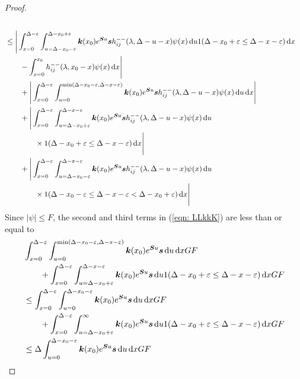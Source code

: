 \begin{proof}
\begin{align}
		\\&\leq \Bigg| \int_{x=0}^{\Delta-\varepsilon}\int_{u=\Delta-x_0-\varepsilon}^{\Delta-x_0+\varepsilon} \boldsymbol k(x_0)e^{\boldsymbol Su}\boldsymbol s h_{ij}^{--}(\lambda, \Delta - u - x) \psi(x) \, \mathrm{d} u 1(\Delta-x_0+\varepsilon\leq \Delta-x-\varepsilon) \, \mathrm{d} x\nonumber
		\\&\qquad{} - \int_{x=0}^{x_0} h_{ij}^{--}(\lambda, x_0 - x)\psi(x)\, \mathrm{d} x \Bigg| \nonumber 
		\\&\qquad {}+\Bigg|\int_{x=0}^{\Delta-\varepsilon}\int_{u=0}^{\min(\Delta-x_0-\varepsilon,\Delta-x-\varepsilon)} \boldsymbol k(x_0)e^{\boldsymbol Su}\boldsymbol s h_{ij}^{--}(\lambda, \Delta - u - x) \psi(x) \, \mathrm{d} u \, \mathrm{d} x\Bigg|\nonumber
		\\&\qquad {}+\Bigg|\int_{x=0}^{\Delta-\varepsilon}\int_{u=\Delta-x_0+\varepsilon}^{\Delta-x-\varepsilon} \boldsymbol k(x_0)e^{\boldsymbol Su}\boldsymbol s h_{ij}^{--}(\lambda, \Delta - u - x) \psi(x) \, \mathrm{d} u \nonumber 
		\\&\qquad\qquad \times1(\Delta-x_0+\varepsilon\leq \Delta - x -\varepsilon)\, \mathrm{d} x\Bigg|\nonumber
		\\&\qquad {}+\Bigg|\int_{x=0}^{\Delta-\varepsilon}\int_{u=\Delta-x_0-\varepsilon}^{\Delta-x-\varepsilon} \boldsymbol k(x_0)e^{\boldsymbol Su}\boldsymbol s h_{ij}^{--}(\lambda, \Delta - u - x) \psi(x) \, \mathrm{d} u \nonumber
		\\&\qquad\qquad \times 1(\Delta-x_0-\varepsilon\leq \Delta - x -\varepsilon < \Delta-x_0+\varepsilon)\, \mathrm{d} x\Bigg|   \label{eqn: LLkkK}
	\end{align}
	Since \(|\psi|\leq F\), the second and third terms in (\ref{eqn: LLkkK}) are less than or equal to 
	\begin{align}
		&\int_{x=0}^{\Delta-\varepsilon}\int_{u=0}^{\min(\Delta-x_0-\varepsilon,\Delta-x-\varepsilon)} \bs k(x_0)e^{\bs Su}\bs s  \wrt u \wrt xGF \nonumber
		\\&\qquad {}+\int_{x=0}^{\Delta-\varepsilon}\int_{u=\Delta-x_0+\varepsilon}^{\Delta-x-\varepsilon} \bs k(x_0)e^{\bs Su}\bs s  \wrt u 1(\Delta-x_0+\varepsilon\leq \Delta - x -\varepsilon)\wrt x GF \nonumber
		\\&\leq \int_{x=0}^{\Delta-\varepsilon}\int_{u=0}^{\Delta-x_0-\varepsilon} \bs k(x_0)e^{\bs Su}\bs s  \wrt u \wrt xGF \nonumber
		\\&\qquad {}+\int_{x=0}^{\Delta-\varepsilon}\int_{u=\Delta-x_0+\varepsilon}^{\infty} \bs k(x_0)e^{\bs Su}\bs s  \wrt u 1(\Delta-x_0+\varepsilon\leq \Delta - x -\varepsilon)\wrt x GF \nonumber
		\\&\leq\Delta\int_{u=0}^{\Delta-x_0-\varepsilon} \bs k(x_0)e^{\bs Su}\bs s  \wrt u \wrt xGF 

\end{align}
\end{proof}
